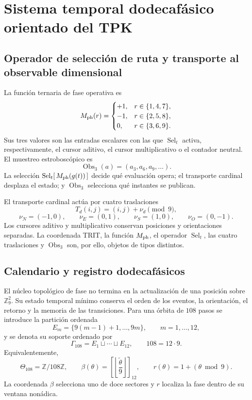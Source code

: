 \section{Sistema temporal dodecafásico orientado del TPK}
\label{sec:ciclo-dodecafasico-tpk-rev7}


\subsection{Operador de selección de ruta y transporte al observable dimensional}

La función ternaria de fase operativa es
\[
M_{\rm ph}(r)=
\begin{cases}
 +1,&r\in\{1,4,7\},\\
 -1,&r\in\{2,5,8\},\\
 0,&r\in\{3,6,9\}.
\end{cases}
\]
Sus tres valores son las entradas escalares con las que
\(\operatorname{Sel}_t\) activa, respectivamente, el cursor aditivo, el
cursor multiplicativo o el contador neutral. El muestreo estroboscópico es
\[
 \operatorname{Obs}_3(a)=(a_3,a_6,a_9,\ldots).
\]
La selección \(\operatorname{Sel}_t[\,M_{\rm ph}(g(t))\,]\) decide qué
evaluación opera; el transporte cardinal desplaza el estado; y
\(\operatorname{Obs}_3\) selecciona qué instantes se publican.

El transporte cardinal actúa por cuatro traslaciones
\[
 T_d(i,j)=(i,j)+\nu_d\pmod9,
\]
\[
 \nu_N=(-1,0),\qquad \nu_E=(0,1),\qquad
 \nu_S=(1,0),\qquad \nu_O=(0,-1).
\]
Los cursores aditivo y multiplicativo conservan posiciones y orientaciones
separadas. La coordenada TRIT, la función \(M_{\rm ph}\), el operador
\(\operatorname{Sel}_t\), las cuatro traslaciones y
\(\operatorname{Obs}_3\) son, por ello, objetos de tipos distintos.

\subsection{Calendario y registro dodecafásicos}

El núcleo topológico de fase no termina en la actualización de una posición
sobre \(\mathbb Z_9^2\). Su estado temporal mínimo conserva el orden de los
eventos, la orientación, el retorno y la memoria de las transiciones. Para
una órbita de \(108\) pasos se introduce la partición ordenada
\[
 E_m=\{9(m-1)+1,\ldots,9m\},
 \qquad m=1,\ldots,12,
\]
y se denota su soporte ordenado por
\[
 \Gamma_{108}=E_1\sqcup\cdots\sqcup E_{12},
 \qquad 108=12\cdot9.
\]
Equivalentemente,
\[
 \Theta_{108}=\mathbb Z/108\mathbb Z,\qquad
 \beta(\theta)=
 \left[\left\lfloor\frac{\widetilde\theta}{9}\right\rfloor\right]_{12},
 \qquad
 r(\theta)=1+(\theta\bmod9).
\]
La coordenada \(\beta\) selecciona uno de doce sectores y \(r\) localiza la
fase dentro de su ventana nonádica.

